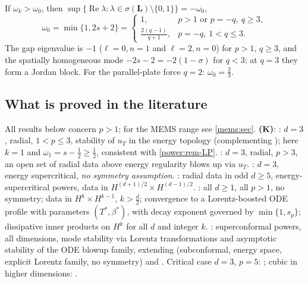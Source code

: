 \begin{corollary}\label{power:cor-gap}
If $\omega_k>\omega_0$, then
$\sup\{\operatorname{Re}\lambda:\lambda\in\sigma(\mathbf L)\setminus\{0,1\}\}=-\omega_0$,
\[
  \omega_0=\min\{1,2s+2\}=\begin{cases}1,& p>1\text{ or }p=-q,\ q\ge3,\\[2pt]
  \frac{2(q-1)}{q+1},& p=-q,\ 1<q\le3.\end{cases}
\]
The gap eigenvalue is $-1$ ($\ell=0,n=1$ and $\ell=2,n=0$) for $p>1$, $q\ge3$, and
the spatially homogeneous mode $-2s-2=-2(1-\sigma)$ for $q<3$; at $q=3$ they form a
Jordan block. For the parallel-plate force $q=2$: $\omega_0=\frac23$.
\end{corollary}

\subsection{What is proved in the literature}
\label{power:subsec-lit}

All results below concern $p>1$; for the MEMS range see \cref{mems:sec}.
\textbf{(K)}:
\cite{DonningerSchoerkhuber2012}: $d=3$, radial, $1<p\le3$, stability of $u_T$ in
the energy topology (complementing \cite{MerleZaag2003,MerleZaag2007}); here
$k=1$ and $\omega_1=s-\frac12\ge\frac12$, consistent with \cref{power:rem-LP}.
\cite{DonningerSchoerkhuber2014}: $d=3$, radial, $p>3$, an open set of radial data
above energy regularity blows up via $u_T$.
\cite{DonningerSchoerkhuber2016}: $d=3$, energy supercritical, \emph{no symmetry
assumption}. \cite{DonningerSchoerkhuber2017}: radial data in odd $d\ge5$,
energy-supercritical powers, data in $H^{(d+1)/2}\times H^{(d-1)/2}$.
\cite{Ostermann2024}: all $d\ge1$, all $p>1$, no symmetry; data in
$H^k\times H^{k-1}$, $k>\frac d2$; convergence to a Lorentz-boosted ODE profile with
parameters $(T^*,\beta^*)$, with decay exponent governed by $\min\{1,s_p\}$;
dissipative inner products on $H^k$ for all $d$ and integer $k$.
\cite{Liu2025}: superconformal powers, all dimensions, mode stability via Lorentz
transformations and asymptotic stability of the ODE blowup family, extending
\cite{MerleZaag2016} (subconformal, energy space, explicit Lorentz family, no
symmetry) and \cite{Ostermann2024}. Critical case $d=3$, $p=5$:
\cite{Donninger2017,DonningerRao2018}; cubic in higher dimensions:
\cite{ChatzikaleasDonninger2019}.

